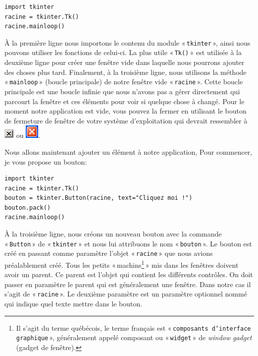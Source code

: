 \begin{Verbatim}[frame=single,rulecolor=\color{mbleu}, label=à taper et sauver dans un nouveau fichier .py]
import tkinter
racine = tkinter.Tk()
racine.mainloop()
\end{Verbatim}

À la première ligne nous importons le contenu du module « \texttt{tkinter} », ainsi nous pouvons utiliser les fonctions de celui-ci. La plus utile « \texttt{Tk()} »  est utilisée à la deuxième ligne pour créer une fenêtre vide dans laquelle nous pourrons ajouter des choses plus tard. Finalement, à la troisième ligne, nous utilisons la méthode « \texttt{mainloop} » (boucle principale) de notre fenêtre vide « \texttt{racine} ». Cette boucle principale est une boucle infinie que nous n'avons pas a gérer directement qui parcourt la fenêtre et ces éléments pour voir si quelque chose à changé. Pour le moment notre application est vide, vous pouvez la fermer en utilisant le bouton de fermeture de fenêtre de votre système d'exploitation qui devrait ressembler à  \includegraphics[scale=1]{images/fermer} ou \includegraphics[scale=1]{images/fermer2}.

Nous allons maintenant ajouter un élément à notre application, Pour commencer, je vous propose un bouton:

\begin{Verbatim}[frame=single,rulecolor=\color{mbleu}, label=à taper et sauver dans un nouveau fichier .py]
import tkinter
racine = tkinter.Tk()
bouton = tkinter.Button(racine, text="Cliquez moi !")
bouton.pack()
racine.mainloop()
\end{Verbatim}

À la troisième ligne, nous créons un nouveau bouton avec la commande « \texttt{Button} » de « \texttt{tkinter} » et nous lui attribuons le nom « \texttt{bouton} ». Le bouton est créé en passant comme paramètre l'objet « \texttt{racine} »  que nous avions préalablement créé. Tous les petits « machins\footnote{Il s'agit du terme québécois, le terme français est « \texttt{composants d'interface graphique} », généralement appelé composant ou  « \texttt{widget} »  de \emph{window gadget} (gadget de fenêtre).} » mis dans les fenêtres doivent avoir un parent. Ce parent est l'objet qui contient les différents contrôles. On doit passer en paramètre le parent qui est généralement une fenêtre. Dans notre cas il s'agit de « \texttt{racine} ». Le deuxième paramètre est un paramètre optionnel nommé qui indique quel texte mettre dans le bouton.

